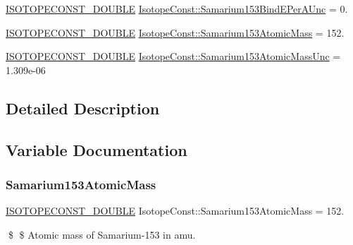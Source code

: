 \begin{DoxyCompactItemize}
\mbox{\hyperlink{group___isotope_const-_macros_ga8f45a7272ce02c0b4c65c44636ed719a}{I\+S\+O\+T\+O\+P\+E\+C\+O\+N\+S\+T\+\_\+\+D\+O\+U\+B\+LE}} \mbox{\hyperlink{group___isotope_const-_samarium-_sm153_gad0781acd429e99f9ff87f897e07f64c4}{Isotope\+Const\+::\+Samarium153\+Bind\+E\+Per\+A\+Unc}} = 0.
\item 
\mbox{\hyperlink{group___isotope_const-_macros_ga8f45a7272ce02c0b4c65c44636ed719a}{I\+S\+O\+T\+O\+P\+E\+C\+O\+N\+S\+T\+\_\+\+D\+O\+U\+B\+LE}} \mbox{\hyperlink{group___isotope_const-_samarium-_sm153_ga1741b1b5618ac7a65f03406ceb623b87}{Isotope\+Const\+::\+Samarium153\+Atomic\+Mass}} = 152.
\item 
\mbox{\hyperlink{group___isotope_const-_macros_ga8f45a7272ce02c0b4c65c44636ed719a}{I\+S\+O\+T\+O\+P\+E\+C\+O\+N\+S\+T\+\_\+\+D\+O\+U\+B\+LE}} \mbox{\hyperlink{group___isotope_const-_samarium-_sm153_ga6624a61885b84bae1ea65ed935bea019}{Isotope\+Const\+::\+Samarium153\+Atomic\+Mass\+Unc}} = 1.\+309e-\/06
\end{DoxyCompactItemize}


\subsection{Detailed Description}


\subsection{Variable Documentation}
\mbox{\label{group___isotope_const-_samarium-_sm153_ga1741b1b5618ac7a65f03406ceb623b87}} 
\subsubsection{\texorpdfstring{Samarium153\+Atomic\+Mass}{Samarium153AtomicMass}}
{\footnotesize\ttfamily \mbox{\hyperlink{group___isotope_const-_macros_ga8f45a7272ce02c0b4c65c44636ed719a}{I\+S\+O\+T\+O\+P\+E\+C\+O\+N\+S\+T\+\_\+\+D\+O\+U\+B\+LE}} Isotope\+Const\+::\+Samarium153\+Atomic\+Mass = 152.}

\$ \$ Atomic mass of Samarium-\/153 in amu. \mbox{\label{group___isotope_const-_samarium-_sm153_ga6624a61885b84bae1ea65ed935bea019}} 
